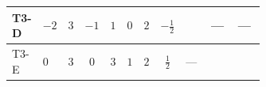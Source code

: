 \documentclass[8pt]{article}
\begin{document}
\begin{landscape}
\begin{longtable}{@{}llcccccc >{\raggedright\arraybackslash}p{0.21\linewidth} >{\raggedright\arraybackslash}p{0.21\linewidth} >{\raggedright\arraybackslash}p{0.21\linewidth}@{}}
\midrule
T3-D & $-2$ & $3$ & $-1$ & $1$ & $0$ & $2$ & $-\frac{1}{2}$ & \scriptsize\adjustbox{max width=\linewidth}{$\begin{gathered} +4 {\lambda_{12}} {\lambda_{S_1}^{\rm Adj}}\end{gathered}$} & --- & --- \\
\midrule
T3-E & $0$ & $3$ & $0$ & $3$ & $1$ & $2$ & $\frac{1}{2}$ & --- & \scriptsize\adjustbox{max width=\linewidth}{$\begin{gathered} \frac{4}{3} {\lambda_{T3}} \left({\lambda_{T3}}\right)^{*}\end{gathered}$} & \scriptsize\adjustbox{max width=\linewidth}{$\begin{gathered} +16 {g_2}^4\end{gathered}$} \\
\midrule
\bottomrule
\end{longtable}
\clearpage

\end{landscape}
\end{document}

